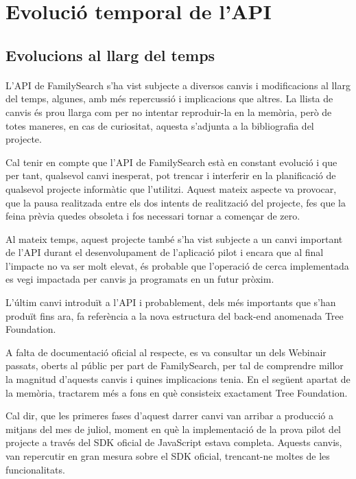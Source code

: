 \section{Evolució temporal de l'API}

    \subsection{Evolucions al llarg del temps}

    \paragraph{}
    L’API de FamilySearch s’ha vist subjecte a diversos canvis i modificacions al llarg del temps, algunes, amb més repercussió i implicacions que altres. La llista de canvis és prou llarga com per no intentar reproduir-la en la memòria, però de totes maneres, en cas de curiositat, aquesta s'adjunta a la bibliografia del projecte.

    Cal tenir en compte que l'API de FamilySearch està en constant evolució i que per tant, qualsevol canvi inesperat, pot trencar i interferir en la planificació de qualsevol projecte informàtic que l'utilitzi. Aquest mateix aspecte va provocar, que la pausa realitzada entre els dos intents de realització del projecte, fes que la feina prèvia quedes obsoleta i fos necessari tornar a començar de zero.

    Al mateix temps, aquest projecte també s'ha vist subjecte a un canvi important de l'API durant el desenvolupament de l'aplicació pilot i encara que al final l'impacte no va ser molt elevat, és probable que l'operació de cerca implementada es vegi impactada per canvis ja programats en un futur pròxim.

    L’últim canvi introduït a l'API i probablement, dels més importants que s'han produït fins ara, fa referència a la nova estructura del back-end anomenada Tree Foundation.

    A falta de documentació oficial al respecte, es va consultar un dels Webinair passats, oberts al públic per part de FamilySearch, per tal de comprendre millor la magnitud d'aquests canvis i quines implicacions tenia. En el següent apartat de la memòria, tractarem més a fons en què consisteix exactament Tree Foundation.

    Cal dir, que les primeres fases d'aquest darrer canvi van arribar a producció a mitjans del mes de juliol, moment en què la implementació de la prova pilot del projecte a través del SDK oficial de JavaScript estava completa. Aquests canvis, van repercutir en gran mesura sobre el SDK oficial, trencant-ne moltes de les funcionalitats.

